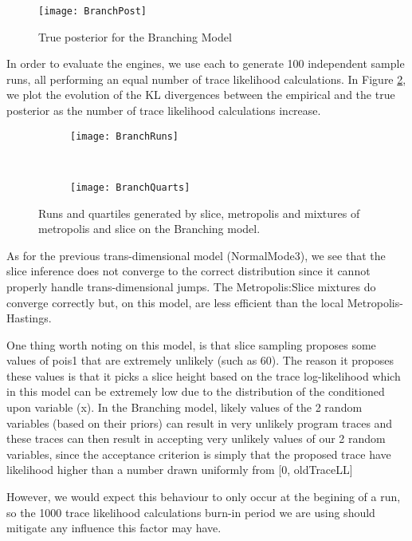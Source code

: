 \begin{figure}[h]
    \centering
    \texttt{[image: BranchPost]}
    \caption{True posterior for the Branching Model}
    \label{fig:BranchPost}
\end{figure}

In order to evaluate the engines, we use each to generate 100 independent sample runs, all performing an equal number of trace likelihood calculations. In Figure \ref{fig:branchPerf}, we plot the evolution of the KL divergences between the empirical and the true posterior as the number of trace likelihood calculations increase.

\begin{figure}[h]
        \centering
        \begin{subfigure}[b]{0.48\textwidth}
                \centering
                \texttt{[image: BranchRuns]}
        \end{subfigure}
        ~ 
        \begin{subfigure}[b]{0.48\textwidth}
                \centering
                \texttt{[image: BranchQuarts]}
        \end{subfigure}
    \caption{Runs and quartiles generated by slice, metropolis and mixtures of metropolis and slice on the Branching model.}
    \label{fig:branchPerf}
\end{figure}

As for the previous trans-dimensional model (NormalMode3), we see that the slice inference does not converge to the correct distribution since it cannot properly handle trans-dimensional jumps. The Metropolis:Slice mixtures do converge correctly but, on this model, are less efficient than the local Metropolis-Hastings.

One thing worth noting on this model, is that slice sampling proposes some values of pois1 that are extremely unlikely (such as 60). The reason it proposes these values is that it picks a slice height based on the trace log-likelihood which in this model can be extremely low due to the distribution of the conditioned upon variable (x). In the Branching model, likely values of the 2 random variables (based on their priors) can result in very unlikely program traces and these traces can then result in accepting very unlikely values of our 2 random variables, since the acceptance criterion is simply that the proposed trace have likelihood higher than a number drawn uniformly from [0, oldTraceLL]

However, we would expect this behaviour to only occur at the begining of a run, so the 1000 trace likelihood calculations burn-in period we are using should mitigate any influence this factor may have.


